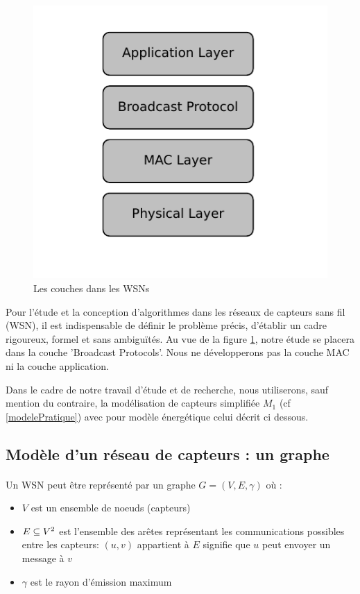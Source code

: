 \begin{figure}[h]
\centering
\includegraphics[scale=0.9]{Etat_de_l'art/source/layer.pdf}
\caption{\label{Layer} Les couches dans les WSNs}
\end{figure}

Pour l'étude et la conception d'algorithmes dans les réseaux de capteurs sans fil (WSN), il est indispensable de définir le problème précis, d'établir un cadre rigoureux, formel et sans ambiguïtés. Au vue de la figure \ref{Layer}, notre étude se placera dans la couche 'Broadcast Protocols'. Nous ne développerons pas la couche MAC ni la couche application.

Dans le cadre de notre travail d'étude et de recherche, nous utiliserons, sauf mention du contraire, la modélisation de capteurs simplifiée $M_1$ (cf \ref{modelePratique}) avec pour modèle énergétique celui décrit ci dessous.

\subsection{Modèle d'un réseau de capteurs : un graphe}

 \paragraph*{} Un WSN peut être représenté par un graphe $G= (V,E,\gamma)$ où :
 \begin{itemize}
 \item $V$ est un ensemble de noeuds (capteurs)
 \item $E \subseteq V \textsuperscript{2}$ est l'ensemble des arêtes représentant les communications possibles entre les capteurs: $(u,v)$ appartient à $E$ signifie que $u$ peut envoyer un  message à $v$
 \item $\gamma$ est le rayon d'émission maximum
 \end{itemize}
 
